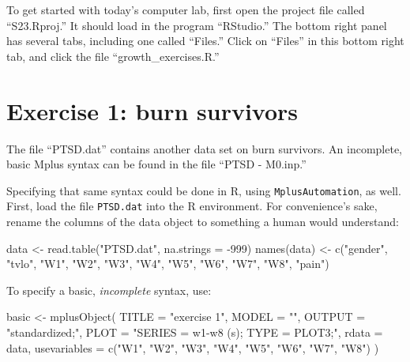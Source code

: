 \documentclass[
]{book}
\newenvironment{Shaded}{\begin{snugshade}}{\end{snugshade}}
\newcommand{\AttributeTok}[1]{\textcolor[rgb]{0.77,0.63,0.00}{#1}}
\newcommand{\DecValTok}[1]{\textcolor[rgb]{0.00,0.00,0.81}{#1}}
\newcommand{\FunctionTok}[1]{\textcolor[rgb]{0.00,0.00,0.00}{#1}}
\newcommand{\NormalTok}[1]{#1}
\newcommand{\OtherTok}[1]{\textcolor[rgb]{0.56,0.35,0.01}{#1}}
\newcommand{\SpecialCharTok}[1]{\textcolor[rgb]{0.00,0.00,0.00}{#1}}
\newcommand{\StringTok}[1]{\textcolor[rgb]{0.31,0.60,0.02}{#1}}
\begin{document}
To get started with today's computer lab, first open the project file called ``S23.Rproj.'' It should load in the program ``RStudio.'' The bottom right panel has several tabs, including one called ``Files.'' Click on ``Files'' in this bottom right tab, and click the file ``growth\_exercises.R.''

\hypertarget{exercise-1-burn-survivors}{%
\section{Exercise 1: burn survivors}\label{exercise-1-burn-survivors}}

The file ``PTSD.dat'' contains another data set on burn survivors.
An incomplete, basic Mplus syntax can be found in the file
``PTSD - M0.inp.''

Specifying that same syntax could be done in R, using \texttt{MplusAutomation}, as well.
First, load the file \texttt{PTSD.dat} into the R environment.
For convenience's sake, rename the columns of the data object to something a human would understand:

\begin{Shaded}
\begin{Highlighting}[]
\NormalTok{data }\OtherTok{\textless{}{-}} \FunctionTok{read.table}\NormalTok{(}\StringTok{"PTSD.dat"}\NormalTok{, }\AttributeTok{na.strings =} \SpecialCharTok{{-}}\DecValTok{999}\NormalTok{)}
\FunctionTok{names}\NormalTok{(data) }\OtherTok{\textless{}{-}} \FunctionTok{c}\NormalTok{(}\StringTok{"gender"}\NormalTok{, }\StringTok{"tvlo"}\NormalTok{,}
                 \StringTok{"W1"}\NormalTok{, }\StringTok{"W2"}\NormalTok{, }\StringTok{"W3"}\NormalTok{, }\StringTok{"W4"}\NormalTok{, }\StringTok{"W5"}\NormalTok{, }\StringTok{"W6"}\NormalTok{, }\StringTok{"W7"}\NormalTok{, }\StringTok{"W8"}\NormalTok{,}
                 \StringTok{"pain"}\NormalTok{)}
\end{Highlighting}
\end{Shaded}

To specify a basic, \emph{incomplete} syntax, use:

\begin{Shaded}
\begin{Highlighting}[]
\NormalTok{basic }\OtherTok{\textless{}{-}} \FunctionTok{mplusObject}\NormalTok{(}
  \AttributeTok{TITLE =} \StringTok{"exercise 1"}\NormalTok{,}
  \AttributeTok{MODEL =} \StringTok{""}\NormalTok{,}
  \AttributeTok{OUTPUT =} \StringTok{"standardized;"}\NormalTok{,}
  \AttributeTok{PLOT =} \StringTok{"SERIES = w1{-}w8 (s);}
\StringTok{          TYPE = PLOT3;"}\NormalTok{,}
  \AttributeTok{rdata =}\NormalTok{ data,}
  \AttributeTok{usevariables =}
    \FunctionTok{c}\NormalTok{(}\StringTok{"W1"}\NormalTok{, }\StringTok{"W2"}\NormalTok{, }\StringTok{"W3"}\NormalTok{, }\StringTok{"W4"}\NormalTok{, }\StringTok{"W5"}\NormalTok{, }\StringTok{"W6"}\NormalTok{, }\StringTok{"W7"}\NormalTok{, }\StringTok{"W8"}\NormalTok{)}
\NormalTok{)}
\end{Highlighting}
\end{Shaded}
\end{document}
